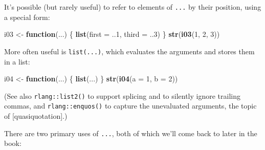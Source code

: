 \documentclass[]{book}
\newenvironment{Shaded}{\begin{snugshade}}{\end{snugshade}}
\newcommand{\ControlFlowTok}[1]{\textcolor[rgb]{0.13,0.29,0.53}{\textbf{#1}}}
\newcommand{\DataTypeTok}[1]{\textcolor[rgb]{0.13,0.29,0.53}{#1}}
\newcommand{\DecValTok}[1]{\textcolor[rgb]{0.00,0.00,0.81}{#1}}
\newcommand{\KeywordTok}[1]{\textcolor[rgb]{0.13,0.29,0.53}{\textbf{#1}}}
\newcommand{\NormalTok}[1]{#1}
\newcommand{\StringTok}[1]{\textcolor[rgb]{0.31,0.60,0.02}{#1}}
\theoremstyle{definition}
\theoremstyle{definition}
\theoremstyle{definition}
\theoremstyle{remark}
\begin{document}
It's possible (but rarely useful) to refer to elements of \texttt{...}
by their position, using a special form:

\begin{Shaded}
\begin{Highlighting}[]
\NormalTok{i03 <-}\StringTok{ }\ControlFlowTok{function}\NormalTok{(...) \{}
  \KeywordTok{list}\NormalTok{(}\DataTypeTok{first =}\NormalTok{ ..}\DecValTok{1}\NormalTok{, }\DataTypeTok{third =}\NormalTok{ ..}\DecValTok{3}\NormalTok{)}
\NormalTok{\}}
\KeywordTok{str}\NormalTok{(}\KeywordTok{i03}\NormalTok{(}\DecValTok{1}\NormalTok{, }\DecValTok{2}\NormalTok{, }\DecValTok{3}\NormalTok{))}
\end{Highlighting}
\end{Shaded}

More often useful is \texttt{list(...)}, which evaluates the arguments
and stores them in a list:

\begin{Shaded}
\begin{Highlighting}[]
\NormalTok{i04 <-}\StringTok{ }\ControlFlowTok{function}\NormalTok{(...) \{}
  \KeywordTok{list}\NormalTok{(...)}
\NormalTok{\}}
\KeywordTok{str}\NormalTok{(}\KeywordTok{i04}\NormalTok{(}\DataTypeTok{a =} \DecValTok{1}\NormalTok{, }\DataTypeTok{b =} \DecValTok{2}\NormalTok{))}
\end{Highlighting}
\end{Shaded}

(See also \texttt{rlang::list2()} to support splicing and to silently
ignore trailing commas, and \texttt{rlang::enquos()} to capture the
unevaluated arguments, the topic of {[}quasiquotation{]}.)

There are two primary uses of \texttt{...}, both of which we'll come
back to later in the book:
\end{document}
